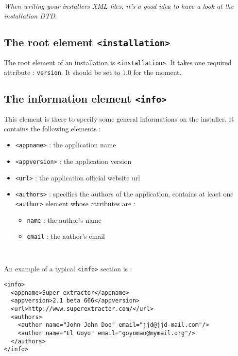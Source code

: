 \noindent
\textit{When writing your installers XML files, it's a good idea to have a look
at the \IzPack installation DTD}.\\

\subsection{The root element \texttt{<installation>}}

The root element of an installation is \texttt{<installation>}. It takes one
required attribute : \texttt{version}. It should be set to $1.0$ for the
moment.\\

\subsection{The information element \texttt{<info>}}

This element is there to specify some general informations on the installer. It
contains the following elements :
\begin{itemize}

  \item \texttt{<appname>} : the application name
  \item \texttt{<appversion>} : the application version
  \item \texttt{<url>} : the application official website url
  \item \texttt{<authors>} : specifies the authors of the application, contains
  at least one \texttt{<author>} element whose attributes are :
  \begin{itemize}
    \item \texttt{name} : the author's name
    \item \texttt{email} : the author's email
  \end{itemize}

\end{itemize}\

An example of a typical \texttt{<info>} section is :\\
\footnotesize
\begin{verbatim}
<info>
  <appname>Super extractor</appname>
  <appversion>2.1 beta 666</appversion>
  <url>http://www.superextractor.com/</url>
  <authors>
    <author name="John John Doo" email="jjd@jjd-mail.com"/>
    <author name="El Goyo" email="goyoman@mymail.org"/>
  </authors>
</info>
\end{verbatim}
\normalsize

